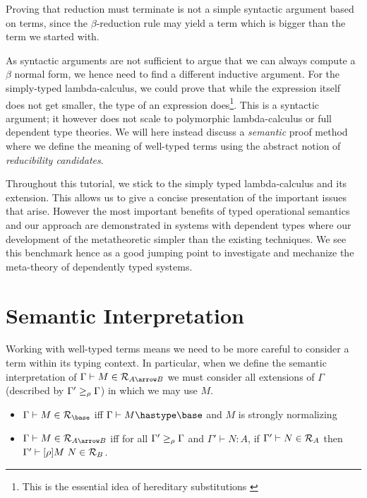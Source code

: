 Proving that reduction must terminate is not a simple syntactic argument based on terms, since the $\beta$-reduction rule may yield a term which is bigger than the term we started with. %

As syntactic arguments are not sufficient to argue that we can always compute a $\beta$ normal form, we hence need to find a different inductive argument. For the simply-typed lambda-calculus, we could prove that while the expression itself does not get smaller,  the type of an expression does\footnote{This is the essential idea of hereditary substitutions \cite{Watkins02tr}}.  This is a syntactic argument; it however does not scale to polymorphic lambda-calculus or full dependent type theories. We will here instead discuss a \emph{semantic} proof method where we define the meaning of well-typed terms using the abstract notion of \emph{reducibility candidates}.

Throughout this tutorial, we stick to the simply typed lambda-calculus and its extension. This allows us to give a concise presentation of the important issues that arise.  However the most important benefits of typed operational semantics and our approach are demonstrated in systems with dependent types  where our development of the metatheoretic simpler than the existing techniques. We see this benchmark hence as a good jumping point to investigate and mechanize the meta-theory of dependently typed systems.



\section{Semantic Interpretation}
Working with well-typed terms means we need to be more careful to
consider a term within its typing context. In particular, when we
define the semantic interpretation of $\inden{\Gamma}{M}{A \arrow B}$
we must consider all extensions of $\Gamma$ (described by $\Gamma'
\geq_{\rho} \Gamma$) in which we may use $M$.

\begin{itemize}
\item $\inden{\Gamma}{M}{\base}$ iff $\Gamma \vdash M\hastype \base$ and $M$ is strongly normalizing
\item $\inden{\Gamma}{M}{A \arrow B}$ iff for all $\Gamma' \geq_{\rho} \Gamma$ and $\Gamma' \vdash N :A$, if $\Gamma' \vdash N \in \mathcal{R}_{A}$ then $\Gamma' \vdash [\rho]M~N \in \mathcal{R}_{B}$.
\end{itemize}



